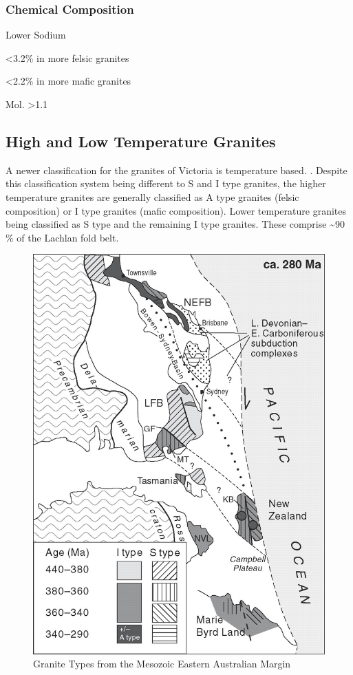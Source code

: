 \documentclass[a4paper]{article}
\begin{document}
\subsubsection{Chemical Composition}
Lower Sodium

 \textless 3.2\% in more felsic granites

 \textless 2.2\% in more mafic granites

Mol.  \textgreater 1.1

\subsection{High and Low Temperature Granites}
A newer classification for the granites of Victoria is temperature based. \cite{chappell1998high}. Despite this classification system being different to S and I type granites, the higher temperature granites are generally classified as A type granites (felsic composition) or I type granites (mafic composition). Lower temperature granites being classified as S type and the remaining I type granites. These comprise \textasciitilde 90 \% of the Lachlan fold belt. \cite{chappell2001two}





\begin{figure}
\centering
\includegraphics[width=1\textwidth]{Granite_Types_from_the_Eastern_Australian_Margin.jpg}
\caption{\label{fig:GraniteTypes}Granite Types from the Mesozoic Eastern Australian Margin}
\end{figure}
\end{document}
